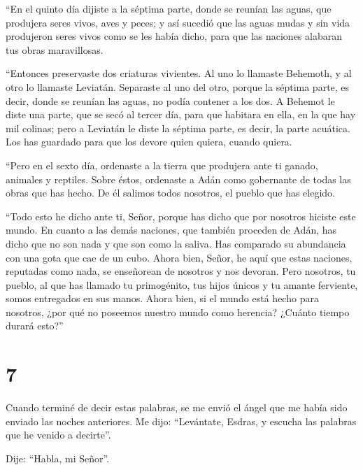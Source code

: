  ``En el quinto día dijiste a la séptima parte, donde se
reunían las aguas, que produjera seres vivos, aves y peces; y así
sucedió  que las aguas mudas y sin vida produjeron seres
vivos como se les había dicho, para que las naciones alabaran tus obras
maravillosas.

 ``Entonces preservaste dos criaturas vivientes. Al uno
lo llamaste Behemoth, y al otro lo llamaste Leviatán. 
Separaste al uno del otro, porque la séptima parte, es decir, donde se
reunían las aguas, no podía contener a los dos.  A
Behemot le diste una parte, que se secó al tercer día, para que habitara
en ella, en la que hay mil colinas;  pero a Leviatán le
diste la séptima parte, es decir, la parte acuática. Los has guardado
para que los devore quien quiera, cuando quiera.

 ``Pero en el sexto día, ordenaste a la tierra que
produjera ante ti ganado, animales y reptiles.  Sobre
éstos, ordenaste a Adán como gobernante de todas las obras que has
hecho. De él salimos todos nosotros, el pueblo que has elegido.

 ``Todo esto he dicho ante ti, Señor, porque has dicho
que por nosotros hiciste este mundo.  En cuanto a las
demás naciones, que también proceden de Adán, has dicho que no son nada
y que son como la saliva. Has comparado su abundancia con una gota que
cae de un cubo.  Ahora bien, Señor, he aquí que estas
naciones, reputadas como nada, se enseñorean de nosotros y nos devoran.
 Pero nosotros, tu pueblo, al que has llamado tu
primogénito, tus hijos únicos y tu amante ferviente, somos entregados en
sus manos.  Ahora bien, si el mundo está hecho para
nosotros, ¿por qué no poseemos nuestro mundo como herencia? ¿Cuánto
tiempo durará esto?''

\hypertarget{section-6}{%
\section{7}\label{section-6}}

 Cuando terminé de decir estas palabras, se me envió el
ángel que me había sido enviado las noches anteriores.  Me
dijo: ``Levántate, Esdras, y escucha las palabras que he venido a
decirte''.

 Dije: ``Habla, mi Señor''.

